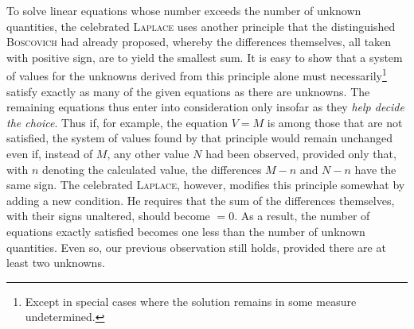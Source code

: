 To solve linear equations whose number exceeds the number of unknown quantities, the celebrated \textsc{Laplace} uses another principle that the distinguished \textsc{Boscovich} had already proposed, whereby the differences themselves, all taken with positive sign, are to yield the smallest sum. It is easy to show that a system of values for the unknowns derived from this principle alone must necessarily\footnote{Except in special cases where the solution remains in some measure undetermined.} satisfy exactly as many of the given equations as there are unknowns. The remaining equations thus enter into consideration only insofar as they \emph{help decide the choice}. Thus if, for example, the equation $V=M$ is among those that are not satisfied, the system of values found by that principle would remain unchanged even if, instead of $M$, any other value $N$ had been observed, provided only that, with $n$ denoting the calculated value, the differences $M-n$ and $N-n$ have the same sign. The celebrated \textsc{Laplace}, however, modifies this principle somewhat by adding a new condition. He requires that the sum of the differences themselves, with their signs unaltered, should become $=0$. As a result, the number of equations exactly satisfied becomes one less than the number of unknown quantities. Even so, our previous observation still holds, provided there are at least two unknowns.
